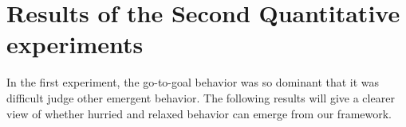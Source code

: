 \documentclass[11pt]{book}
\begin{document}


\clearpage

\section{Results of the Second Quantitative experiments}
\label{sec:secondquantitativeexperimentresults}
In the first experiment, the go-to-goal behavior was so dominant that it was difficult judge other emergent behavior. The following results will give a clearer view of whether hurried and relaxed behavior can emerge from our framework.
\end{document}
